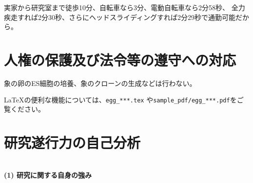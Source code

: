 \documentclass[11pt,a4j,dvipdfmx]{jarticle} 					%
\newcommand{\研究課題名}{象の卵}
\newcommand{\研究機関名}{逢坂大学}
\newcommand{\研究代表者氏名}{湯川秀樹}
\begin{document}
	実家から研究室まで徒歩10分、自転車なら3分、電動自転車なら2分58秒、
	全力疾走すれば2分30秒、さらにヘッドスライディングすれば2分29秒で通勤可能だから。




\section{人権の保護及び法令等の遵守への対応}

	象の卵のES細胞の培養、象のクローンの生成などは行わない。

	\LaTeX の便利な機能については、\texttt{egg\_***.tex} や\texttt{sample\_pdf/egg\_***.pdf}をご覧ください。




\section{研究遂行力の自己分析}

\DCPDInstructionsA\\%
\noindent
\textbf{(1) 研究に関する自身の強み}
\DCPDInstructionsB%
\end{document}
